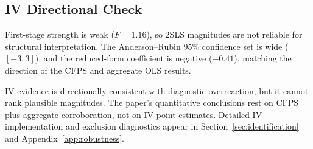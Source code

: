 

\subsection{IV Directional Check}
\label{sec:iv}

First-stage strength is weak ($F = 1.16$), so 2SLS magnitudes are not
reliable for structural interpretation. The Anderson--Rubin 95\%
confidence set is wide ($[-3,3]$), and the reduced-form coefficient is
negative ($-0.41$), matching the direction of the CFPS and aggregate OLS
results.

IV evidence is directionally consistent with diagnostic overreaction, but
it cannot rank plausible magnitudes. The paper's quantitative conclusions
rest on CFPS plus aggregate corroboration, not on IV point estimates.
Detailed IV implementation and exclusion diagnostics appear in
Section~\ref{sec:identification} and Appendix~\ref{app:robustness}.

